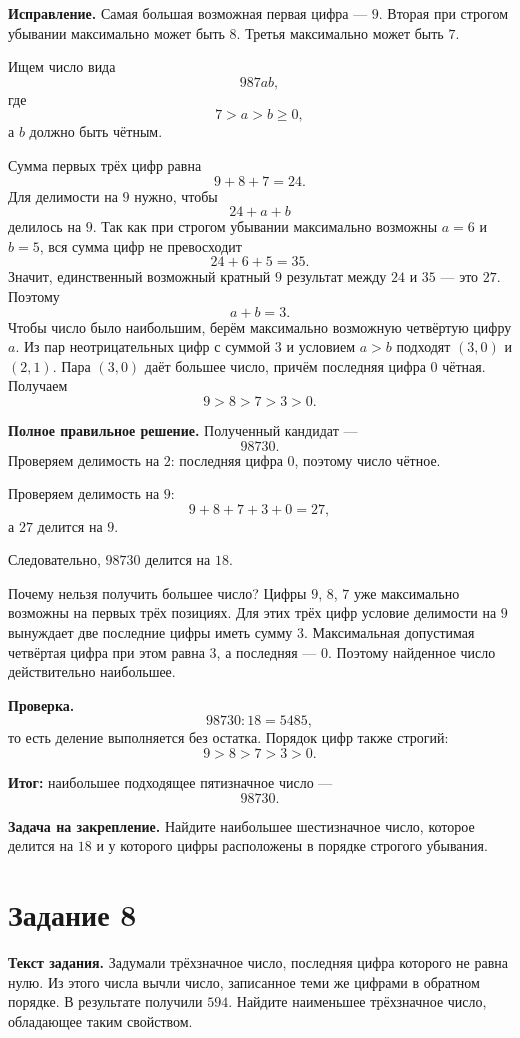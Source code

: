 \documentclass[12pt,a4paper]{article}
\begin{document}
\textbf{Исправление.}
Самая большая возможная первая цифра --- $9$. Вторая при строгом убывании максимально может быть $8$. Третья максимально может быть $7$.

Ищем число вида
\[
987ab,
\]
где
\[
7>a>b\geq 0,
\]
а $b$ должно быть чётным.

Сумма первых трёх цифр равна
\[
9+8+7=24.
\]
Для делимости на $9$ нужно, чтобы
\[
24+a+b
\]
делилось на $9$. Так как при строгом убывании максимально возможны $a=6$ и $b=5$, вся сумма цифр не превосходит
\[
24+6+5=35.
\]
Значит, единственный возможный кратный $9$ результат между $24$ и $35$ --- это $27$. Поэтому
\[
a+b=3.
\]
Чтобы число было наибольшим, берём максимально возможную четвёртую цифру $a$. Из пар неотрицательных цифр с суммой $3$ и условием $a>b$ подходят $(3,0)$ и $(2,1)$. Пара $(3,0)$ даёт большее число, причём последняя цифра $0$ чётная. Получаем
\[
9>8>7>3>0.
\]

\textbf{Полное правильное решение.}
Полученный кандидат ---
\[
98730.
\]
Проверяем делимость на $2$: последняя цифра $0$, поэтому число чётное.

Проверяем делимость на $9$:
\[
9+8+7+3+0=27,
\]
а $27$ делится на $9$.

Следовательно, $98730$ делится на $18$.

Почему нельзя получить большее число? Цифры $9$, $8$, $7$ уже максимально возможны на первых трёх позициях. Для этих трёх цифр условие делимости на $9$ вынуждает две последние цифры иметь сумму $3$. Максимальная допустимая четвёртая цифра при этом равна $3$, а последняя --- $0$. Поэтому найденное число действительно наибольшее.

\textbf{Проверка.}
\[
98730:18=5485,
\]
то есть деление выполняется без остатка. Порядок цифр также строгий:
\[
9>8>7>3>0.
\]

\textcolor{teal!60!black}{\textbf{Итог:}}
наибольшее подходящее пятизначное число ---
\[
\boxed{98730}.
\]

\textbf{Задача на закрепление.}
Найдите наибольшее шестизначное число, которое делится на $18$ и у которого цифры расположены в порядке строгого убывания.

\newpage
{}\label{task:8}
\section*{Задание 8}

\textbf{Текст задания.}
Задумали трёхзначное число, последняя цифра которого не равна нулю. Из этого числа вычли число, записанное теми же цифрами в обратном порядке. В результате получили $594$. Найдите наименьшее трёхзначное число, обладающее таким свойством.
\end{document}
